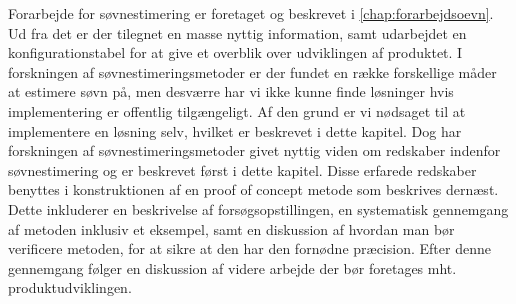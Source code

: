 Forarbejde for søvnestimering er foretaget og beskrevet i \cref{chap:forarbejdsoevn}.
Ud fra det er der tilegnet en masse nyttig information, samt udarbejdet en konfigurationstabel for at give et overblik over udviklingen af produktet.
I forskningen af søvnestimeringsmetoder er der fundet en række forskellige måder at estimere søvn på, men desværre har vi ikke kunne finde løsninger hvis implementering er offentlig tilgængeligt.
Af den grund er vi nødsaget til at implementere en løsning selv, hvilket er beskrevet i dette kapitel.
Dog har forskningen af søvnestimeringsmetoder givet nyttig viden om redskaber indenfor søvnestimering og er beskrevet først i dette kapitel.
Disse erfarede redskaber benyttes i konstruktionen af en proof of concept metode som beskrives dernæst.
Dette inkluderer en beskrivelse af forsøgsopstillingen, en systematisk gennemgang af metoden inklusiv et eksempel, samt en diskussion af hvordan man bør verificere metoden, for at sikre at den har den fornødne præcision.
Efter denne gennemgang følger en diskussion af videre arbejde der bør foretages mht. produktudviklingen.







